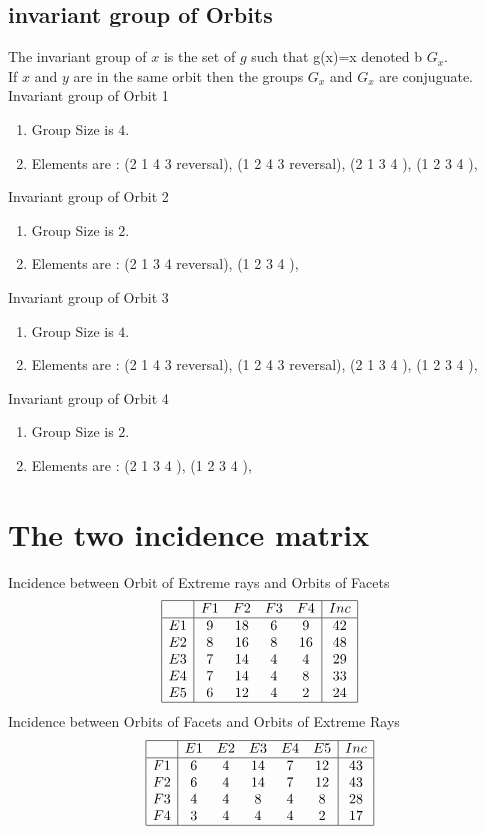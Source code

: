 \documentclass[12pt]{article}
\begin{document}
\subsection{invariant group of Orbits}
\noindent The invariant group of $x$ is the set of $g$ such that g(x)=x denoted b $G_x$.\\
If $x$ and $y$ are in the same orbit then the groups $G_x$ and  $G_x$ are conjuguate.\\
Invariant group of Orbit 1
\begin{enumerate}
\item Group Size is $4$.
\item Elements are : (2 1 4 3   reversal), (1 2 4 3   reversal), (2 1 3 4  ), (1 2 3 4  ), 
\end{enumerate}
Invariant group of Orbit 2
\begin{enumerate}
\item Group Size is $2$.
\item Elements are : (2 1 3 4   reversal), (1 2 3 4  ), 
\end{enumerate}
Invariant group of Orbit 3
\begin{enumerate}
\item Group Size is $4$.
\item Elements are : (2 1 4 3   reversal), (1 2 4 3   reversal), (2 1 3 4  ), (1 2 3 4  ), 
\end{enumerate}
Invariant group of Orbit 4
\begin{enumerate}
\item Group Size is $2$.
\item Elements are : (2 1 3 4  ), (1 2 3 4  ), 
\end{enumerate}
\section{The two incidence matrix}
Incidence between Orbit of Extreme rays and Orbits of Facets
\begin{equation*}
\begin{array}{|c|cccc|c|}
\hline
&F1&F2&F3&F4&Inc\\
\hline
E1&9&18&6&9&42\\
E2&8&16&8&16&48\\
E3&7&14&4&4&29\\
E4&7&14&4&8&33\\
E5&6&12&4&2&24\\
\hline
\end{array}
\end{equation*}
Incidence between Orbits of Facets and Orbits of Extreme Rays
\begin{equation*}
\begin{array}{|c|ccccc|c|}
\hline
&E1&E2&E3&E4&E5&Inc\\
\hline
F1&6&4&14&7&12&43\\
F2&6&4&14&7&12&43\\
F3&4&4&8&4&8&28\\
F4&3&4&4&4&2&17\\
\hline
\end{array}
\end{equation*}
\end{document}
